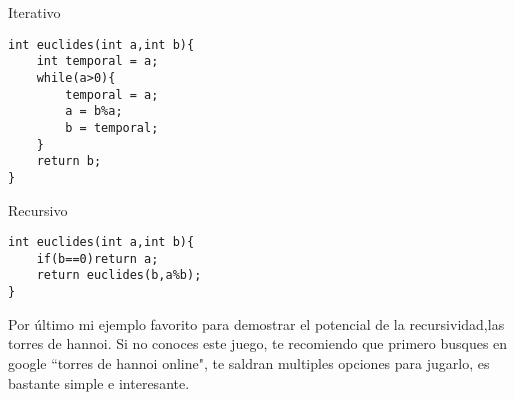 \begin{minipage}{\textwidth}
Iterativo
\begin{lstlisting}[style=C,caption=euclidesIterativo.cpp]
int euclides(int a,int b){
    int temporal = a;
    while(a>0){
        temporal = a;
        a = b%a;
        b = temporal;
    }
    return b;
}
\end{lstlisting}
\end{minipage}
\begin{minipage}{\textwidth}
Recursivo
\\\begin{lstlisting}[style=C,caption=euclidesRecursivo.cpp]
int euclides(int a,int b){
    if(b==0)return a;
    return euclides(b,a%b);
}
\end{lstlisting}
\end{minipage}

Por último mi ejemplo favorito para demostrar el potencial de la recursividad,las
torres de hannoi. Si no conoces este juego, te recomiendo que primero busques
en google ``torres de hannoi online", te saldran multiples opciones para jugarlo, es bastante simple
e interesante.

